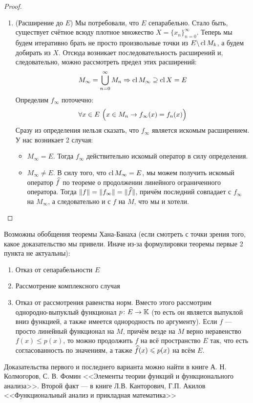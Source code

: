 \begin{proof}
\begin{enumerate}
		\item (Расширение до $E$) Мы потребовали, что $E$ сепарабельно. Стало быть, существует счётное всюду плотное множество $X = \{x_n\}_{n = 0}^\infty$. Теперь мы будем итеративно брать не просто произвольные точки из $E \backslash \operatorname{cl} M_k$, а будем добирать из $X$. Отсюда возникает последовательность расширений и, следовательно, можно рассмотреть предел этих расширений:
		\[
			M_\infty = \bigcup_{n = 0}^\infty M_n \Rightarrow \operatorname{cl} M_\infty \supseteq \operatorname{cl} X = E
		\]
		Определим $f_\infty$ поточечно:
		\[
			\forall x \in E\ \Big(x \in M_n \rightarrow f_\infty(x) = f_n(x)\Big)
		\]
		Сразу из определения нельзя сказать, что $f_\infty$ является искомым расширением. У нас возникает 2 случая:
		\begin{itemize}
			\item $M_\infty = E$. Тогда $f_\infty$ действительно искомый оператор в силу определения.
			
			\item $M_\infty \neq E$. В силу того, что $\operatorname{cl} M_\infty = E$, мы можем получить искомый оператор $\widehat{f}$ по теореме о продолжении линейного ограниченного оператора. Тогда $\|f\| = \|f_\infty\| = \|\widehat{f}\|$, причём последний совпадает с $f_\infty$ на $M_\infty$, а следовательно и с $f$ на $M$, что мы и хотели.
		\end{itemize}
	\end{enumerate}
\end{proof}

\begin{note}
	Возможны обобщения теоремы Хана-Банаха (если смотреть с точки зрения того, какое доказательство мы привели. Иначе из-за формулировки теоремы первые 2 пункта не актуальны):
	\begin{enumerate}
		\item Отказ от сепарабельности $E$
		
		\item Рассмотрение комплексного случая
		
		\item Отказ от рассмотрения равенства норм. Вместо этого рассмотрим \\ однородно-выпуклый функционал $p \colon E \to \mathbb{K}$ (то есть он является выпуклой вниз функцией, а также имеется однородность по аргументу). Если $f$ --- просто линейный функционал на $M$, причём везде на $M$ верно неравенство $f(x) \le p(x)$, то можно продолжить $f$ на всё пространство $E$ так, что есть согласованность по значениям, а также $\widehat{f}(x) \leqslant p(x)$ на всём $E$.
	\end{enumerate}
	Доказательства первого и последнего варианта можно найти в книге А. Н. Колмогоров, С. В. Фомин <<Элементы теории функций и функционального анализа>>. Второй факт --- в книге Л.В. Канторович, Г.П. Акилов <<Функциональный анализ и прикладная математика>>
\end{note}

